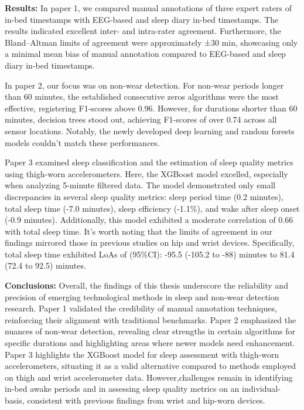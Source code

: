 \documentclass[
  10pt,
]{scrbook}
\let\originaltextbf\textbf
\renewcommand{\textbf}[1]{\textcolor{color1}{\originaltextbf{#1}}}
\begin{document}
\textbf{Results:} In paper 1, we compared manual annotations of three
expert raters of in-bed timestamps with EEG-based and sleep diary in-bed
timestamps. The results indicated excellent inter- and intra-rater
agreement. Furthermore, the Bland--Altman limits of agreement were
approximately ±30 min, showcasing only a minimal mean bias of manual
annotation compared to EEG-based and sleep diary in-bed timestamps.

In paper 2, our focus was on non-wear detection. For non-wear periods
longer than 60 minutes, the established consecutive zeros algorithms
were the most effective, registering F1-scores above 0.96. However, for
durations shorter than 60 minutes, decision trees stood out, achieving
F1-scores of over 0.74 across all sensor locations. Notably, the newly
developed deep learning and random forests models couldn't match these
performances.

Paper 3 examined sleep classification and the estimation of sleep
quality metrics using thigh-worn accelerometers. Here, the XGBoost model
excelled, especially when analyzing 5-minute filtered data. The model
demonstrated only small discrepancies in several sleep quality metrics:
sleep period time (0.2 minutes), total sleep time (-7.0 minutes), sleep
efficiency (-1.1\%), and wake after sleep onset (-0.9 minutes).
Additionally, this model exhibited a moderate correlation of 0.66 with
total sleep time. It's worth noting that the limits of agreement in our
findings mirrored those in previous studies on hip and wrist devices.
Specifically, total sleep time exhibited LoAs of (95\%CI): -95.5 (-105.2
to -88) minutes to 81.4 (72.4 to 92.5) minutes.

\textbf{Conclusions:} Overall, the findings of this thesis underscore
the reliability and precision of emerging technological methods in sleep
and non-wear detection research. Paper 1 validated the credibility of
manual annotation techniques, reinforcing their alignment with
traditional benchmarks. Paper 2 emphasized the nuances of non-wear
detection, revealing clear strengths in certain algorithms for specific
durations and highlighting areas where newer models need enhancement.
Paper 3 highlights the XGBoost model for sleep assessment with
thigh-worn accelerometers, situating it as a valid alternative compared
to methods employed on thigh and wrist accelerometer data.
However,challenges remain in identifying in-bed awake periods and in
assessing sleep quality metrics on an individual-basis, consistent with
previous findings from wrist and hip-worn devices.
\end{document}
